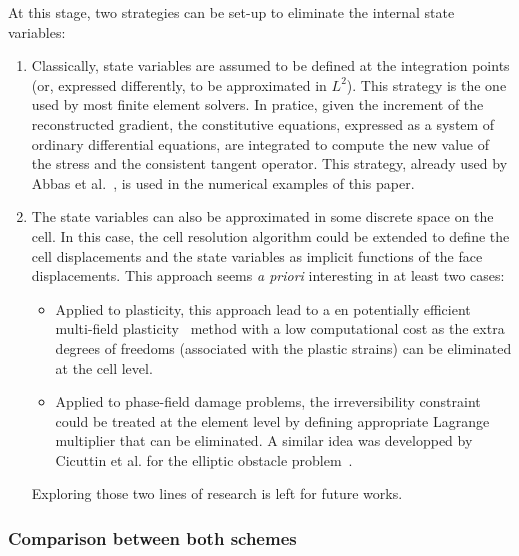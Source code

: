 At this stage, two strategies can be set-up to eliminate the internal
state variables:
\begin{enumerate}
  \item Classically, state variables are assumed to be defined at
  the integration points (or, expressed differently, to be approximated
  in \(L^{2}\)). This strategy is the one used by most finite element
  solvers. In pratice, given the increment of the reconstructed
  gradient, the constitutive equations, expressed as a system of
  ordinary differential equations, are integrated to compute the new
  value of the stress and the consistent tangent operator. This
  strategy, already used by Abbas et
  al.~\cite{abbas_hybrid_2018,abbas_hybrid_2019}, is used in the
  numerical examples of this paper.
  \item The state variables can also be approximated in some
  discrete space on the cell. In this case, the cell resolution
  algorithm could be extended to define the cell displacements and the
  state variables as implicit functions of the face displacements. This
  approach seems \emph{a priori} interesting in at least two cases:
  \begin{itemize}
    \item Applied to plasticity, this approach lead to a en
    potentially efficient multi-field
    plasticity~\cite{simo_computational_1998} method with a low
    computational cost as the extra degrees of freedoms (associated with
    the plastic strains) can be eliminated at the cell level.
    \item Applied to phase-field damage problems, the
    irreversibility constraint could be treated at the element level by
    defining appropriate Lagrange multiplier that can be eliminated. A
    similar idea was developped by Cicuttin et al. for the elliptic
    obstacle problem~\cite{cicuttin_hybrid_2020}.
  \end{itemize}
  Exploring those two lines of research is left for future
  works.
\end{enumerate}


\subsubsection{Comparison between both schemes}
\label{par_cell_eq}

